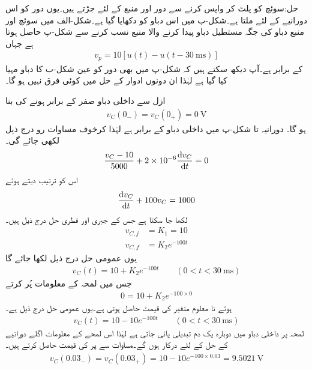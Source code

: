 حل:سوئچ کو پلٹ کر واپس کرنے سے دور اور منبع  کے لئے جڑتے ہیں۔یوں دور کو اس دورانیے کے لئے  ملتا ہے۔شکل-ب میں اس دباو کو دکھایا گیا ہے۔شکل-الف میں سوئچ اور منبع دباو کی جگہ مستطیل  دباو پیدا کرنے والا منبع  نسب کرنے سے شکل-پ حاصل ہوتا ہے جہاں
\begin{align*}
v_p=10\left[u(t)-u(t-\SI{30}{\milli\second})\right]
\end{align*}
کے برابر ہے۔آپ دیکھ سکتے ہیں کہ شکل-پ میں بھی دور کو عین شکل-ب کا دباو مہیا کیا گیا ہے لہٰذا ان دونوں ادوار کے حل میں کوئی فرق نہیں ہو گا۔

ازل سے داخلی دباو صفر کے برابر ہونے کی بنا 
\begin{align*}
v_C(0_-)=v_C(0_+)=\SI{0}{\volt}
\end{align*}
ہو گا۔ دورانیہ  تا شکل-پ  میں داخلی دباو  کے برابر ہے لہٰذا کرخوف مساوات رو درج ذیل لکھی جائے گی۔
\begin{align*}
\frac{v_C-10}{5000}+2\times 10^{-6}\frac{\dif v_C}{\dif t}=0
\end{align*}
اس کو ترتیب دیتے ہوئے
\begin{align*}
\frac{\dif v_C}{\dif t}+100 v_C=1000
\end{align*}
لکھا جا سکتا ہے جس کے جبری اور فطری حل درج ذیل ہیں۔
\begin{align*}
v_{C,j}&=K_1=10\\
v_{C,f}&=K_2 e^{-100t}
\end{align*}
یوں عمومی حل درج ذیل لکھا جائے گا
\begin{align*}
v_C(t)=10+K_2e^{-100t}\quad \quad (0<t<\SI{30}{\milli\second})
\end{align*}
جس میں لمحہ  کے معلومات پُر کرتے
\begin{align*}
0=10+K_2 e^{-100\times 0}
\end{align*}
ہوئے نا معلوم متغیر کی قیمت  حاصل ہوتی ہے۔یوں عمومی حل درج ذیل ہے۔
\begin{align}\label{مساوات_عارضی_مستطیل_مثال_حل_الف}
v_C(t)=10-10e^{-100t}\quad \quad (0<t<\SI{30}{\milli\second})
\end{align}
لمحہ  پر داخلی دباو میں دوبارہ یک دم تبدیلی پائی جاتی ہے لہٰذا اس لمحے کے معلومات اگلے دورانیے کے حل کے لئے درکار ہوں گے۔مساوات  سے  پر  کی قیمت حاصل کرتے ہیں۔
\begin{align*}
v_C(0.03_-)=v_C(0.03_+)=10-10e^{-100\times 0.03}=\SI{9.5021}{\volt}
\end{align*} 
